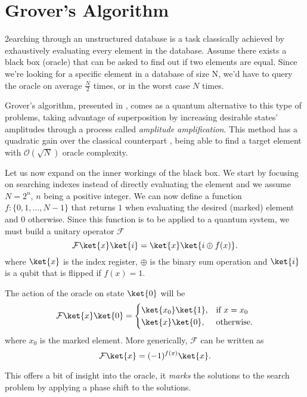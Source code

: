 	\section{Grover's Algorithm}\label{chapGrover}
	2earching through an unstructured database is a task classically achieved by exhaustively evaluating every element in the database. Assume there exists a black box (oracle) that can be asked to find out if two elements are equal. Since we're looking for a specific element in a database of size N, we'd have to query the oracle on average $\frac{N}{2}$ times, or in the worst case $N$ times.\par
	Grover's algorithm, presented in \cite{grover1996}, comes as a quantum alternative to this type of problems, taking advantage of superposition by increasing desirable states' amplitudes through a process called \textit{amplitude amplification}. This method has a quadratic gain over the classical counterpart \cite{boyer1996}, being able to find a target element with $\mathcal{O}(\sqrt{N})$ oracle complexity.\par
	Let us now expand on the inner workings of the black box. We start by focusing on searching indexes     instead of directly evaluating the element and we assume $N=2^{n}$, $n$ being a positive integer. We can now define a function $f : \{0,1,...,N-1\}$ that returns $1$ when evaluating the desired (marked) element and $0$ otherwise. Since this function is to be applied to a quantum system, we must build a unitary operator $\mathcal{F}$
	\begin{equation}
		\mathcal{F}\ket{x}\ket{i} = \ket{x}\ket{i\oplus f(x)} .
	\end{equation}
	where $\ket{x}$ is the index register, $\oplus$ is the binary sum operation and $\ket{i}$ is a qubit that is flipped if $f(x)=1$.\par 
	The action of the oracle on state $\ket{0}$ will be
	\begin{equation}
		\mathcal{F}\ket{x}\ket{0} = \begin{cases} \ket{x_0}\ket{1}, & \mbox{if } x = x_0 \\ \ket{x}\ket{0}, & \mbox{otherwise.} \end{cases}
	\end{equation}
	where $x_0$ is the marked element. More generically, $\mathcal{F}$ can be written as
	\begin{equation}
		\mathcal{F}\ket{x} = (-1)^{f(x)}\ket{x} .
	\end{equation}\par
	This offers a bit of insight into the oracle, it \textit{marks} the solutions to the search problem by applying a phase shift to the solutions. 

